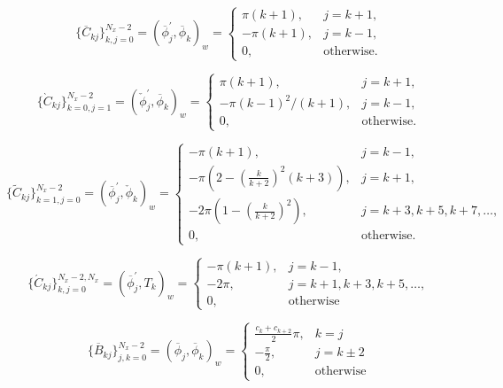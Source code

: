 \documentclass[11pt, oneside]{article}
\newcommand{\N}[1]{\check{#1}}
\newcommand{\D}[1]{\overline{#1}}
\begin{document}
\begin{equation}
 \{\D{C}_{kj}\}_{k,j=0}^{N_x-2} = \left(\D{\phi}^{'}_j, \D{\phi}_k \right)_w = \begin{cases}
 \pi(k+1), &j=k+1,\\
 -\pi(k+1), & j=k-1, \\
 0, &\text{otherwise}.
 \end{cases}
\end{equation}

\begin{equation}
 \{\grave{C}_{kj}\}_{k=0,j=1}^{N_x-2} = \left(\N{\phi}^{'}_j, \D{\phi}_k \right)_w = \begin{cases}
 \pi(k+1), &j=k+1,\\
 -\pi(k-1)^2/(k+1) , & j=k-1, \\
 0, &\text{otherwise}.
 \end{cases}
\end{equation}

\begin{equation}
 \{\tilde{C}_{kj}\}_{k=1,j=0}^{N_x-2} = (\D{\phi}^{'}_j, \N{\phi}_k)_w = \begin{cases}
 -\pi(k+1), &j=k-1,\\
 -\pi(2-\left(\frac{k}{k+2}\right)^2(k+3)) , & j=k+1, \\
 -2 \pi(1-\left(\frac{k}{k+2}\right)^2), &j=k+3, k+5, k+7, \ldots,\\
 0, &\text{otherwise}.
 \end{cases}
\end{equation}

\begin{equation}
  \{\acute{C}_{kj}\}_{k,j=0}^{N_x-2, N_x} = (\D{\phi}^{'}_j, T_k)_w = \begin{cases}
    -\pi (k+1), &j=k-1, \\
    -2 \pi,   &j = k+1, k+3, k+5, \ldots, \\
    0, &\text{otherwise}
  \end{cases}
\end{equation}

\begin{equation}
  \{\D{B}_{kj}\}_{j,k=0}^{N_x-2} = (\D{\phi}_j, \D{\phi}_k)_w = \begin{cases}
  \frac{c_k+c_{k+2}}{2}\pi,& k = j \\
  -\frac{\pi}{2},& j=k\pm 2 \\
  0,& \text{otherwise}
\end{cases}
\end{equation}
\end{document}
